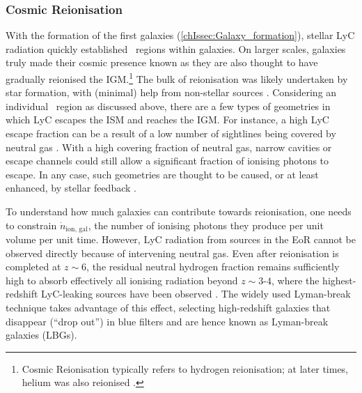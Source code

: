 \subsubsection{Cosmic Reionisation}
\label{chIsssec:Cosmic_Reionisation}

With the formation of the first galaxies (\cref{chIssec:Galaxy_formation}), stellar LyC radiation quickly established \HII\ regions within galaxies. On larger scales, galaxies truly made their cosmic presence known as they are also thought to have gradually reionised the IGM.\footnote{Cosmic Reionisation typically refers to hydrogen reionisation; at later times, helium was also reionised \citep[e.g.][]{2016ApJ...825..144W}.} The bulk of reionisation was likely undertaken by star formation, with (minimal) help from non-stellar sources \citep[such as active galactic nuclei, discussed further in \cref{chIssec:Cosmic_noon_and_the_epoch_of_quenching}; see][]{2021arXiv211013160R}. Considering an individual \HII\ region as discussed above, there are a few types of geometries in which LyC escapes the ISM and reaches the IGM. For instance, a high LyC escape fraction can be a result of a low number of sightlines being covered by neutral gas \citep[quantified by the covering fraction; see e.g.][]{2020ApJ...896...93H}. With a high covering fraction of neutral gas, narrow cavities or escape channels could still allow a significant fraction of ionising photons to escape. In any case, such geometries are thought to be caused, or at least enhanced, by stellar feedback \citep[i.e. winds or SNe;][]{2020MNRAS.498.2001M}.

To understand how much galaxies can contribute towards reionisation, one needs to constrain $\dot{n}_\text{ion, gal}$, the number of ionising photons they produce per unit volume per unit time. However, LyC radiation from sources in the EoR cannot be observed directly because of intervening neutral gas. Even after reionisation is completed at $z \sim 6$, the residual neutral hydrogen fraction remains sufficiently high to absorb effectively all ionising radiation beyond $z \sim 3$-$4$, where the highest-redshift LyC-leaking sources have been observed \citep[e.g.][]{2018MNRAS.476L..15V}. The widely used Lyman-break technique takes advantage of this effect, selecting high-redshift galaxies that disappear (``drop out'') in blue filters and are hence known as Lyman-break galaxies (LBGs).

